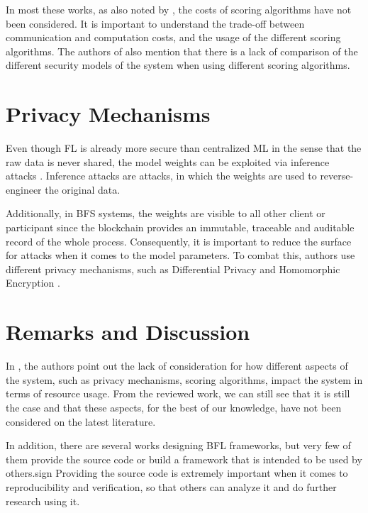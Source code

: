 In most these works, as also noted by \cite{9403374, 10.48550/arxiv.2110.02182}, the costs of scoring algorithms have not been considered. It is important to understand the trade-off between communication and computation costs, and the usage of the different scoring algorithms. The authors of \cite{10.48550/arxiv.2110.02182} also mention that there is a lack of comparison of the different security models of the system when using different scoring algorithms.

\section{Privacy Mechanisms}\label{related_work:privacy}

Even though FL is already more secure than centralized ML in the sense that the raw data is never shared, the model weights can be exploited via inference attacks \cite{10.1145/3298981}. Inference attacks are attacks, in which the weights are used to reverse-engineer the original data.

Additionally, in BFS systems, the weights are visible to all other client or participant since the blockchain provides an immutable, traceable and auditable record of the whole process. Consequently, it is important to reduce the surface for attacks when it comes to the model parameters. To combat this, authors use different privacy mechanisms, such as Differential Privacy \cite{10.48550/arxiv.2007.03856, Peyvandi2022, 9170559} and Homomorphic Encryption \cite{8945913, 8894364}.

\section{Remarks and Discussion}

In \cite{9403374}, the authors point out the lack of consideration for how different aspects of the system, such as privacy mechanisms, scoring algorithms, impact the system in terms of resource usage. From the reviewed work, we can still see that it is still the case and that these aspects, for the best of our knowledge, have not been considered on the latest literature.

In addition, there are several works \cite{10.1145/3422337.3447837, 8945913, 10.48550/arxiv.1910.12603, 10.48550/arxiv.2110.02182} designing BFL frameworks, but very few of them provide the source code or build a framework that is intended to be used by others.sign Providing the source code is extremely important when it comes to reproducibility and verification, so that others can analyze it and do further research using it.

